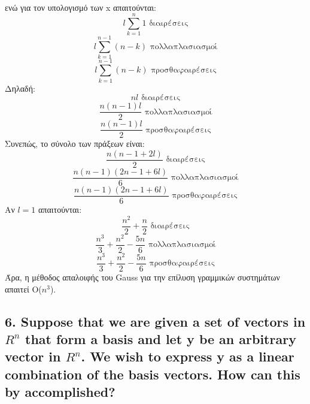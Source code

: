 \documentclass[12pt]{article}
\begin{document}
\\ ενώ για τον υπολογισμό των x απαιτούνται:
$$ l\sum_{k=1}^{n}1 \mbox{ διαιρέσεις}$$
$$ l\sum_{k=1}^{n-1}{(n-k)} \mbox{ πολλαπλασιασμοί}$$
$$ l\sum_{k=1}^{n-1}{(n-k)} \mbox{ προσθαφαιρέσεις}$$
Δηλαδή:
$$ nl \mbox{ διαιρέσεις} $$
$$ \frac{n(n-1)l}{2} \mbox{ πολλαπλασιασμοί}$$
$$ \frac{n(n-1)l}{2} \mbox{ προσθαφαιρέσεις}$$
Συνεπώς, το σύνολο των πράξεων είναι:
$$ \frac{n(n-1+2l)}{2} \mbox{ διαιρέσεις} $$
$$ \frac{n(n-1)(2n-1+6l)}{6} \mbox{ πολλαπλασιασμοί}$$
$$ \frac{n(n-1)(2n-1+6l)}{6} \mbox{ προσθαφαιρέσεις}$$
Αν $l=1$ απαιτούνται:
$$ \frac{n^2}{2} + \frac{n}{2} \mbox{ διαιρέσεις}$$
$$ \frac{n^3}{3} + \frac{n^2}{2} - \frac{5n}{6} \mbox{ πολλαπλασιασμοί}$$
$$ \frac{n^3}{3} + \frac{n^2}{2} - \frac{5n}{6} \mbox{ προσθαφαιρέσεις}$$
Άρα, η μέθοδος απαλοιφής του Gauss για την επίλυση γραμμικών συστημάτων απαιτεί Ο($n^3$).
\vspace{2in}


\pagebreak

\subsection*{6. Suppose that we are given a set of vectors in $R^n$ that form a basis and let y be an
arbitrary vector in $R^n$. We wish to express y as a linear combination of the basis vectors. How
can this by accomplished?}
\end{document}
